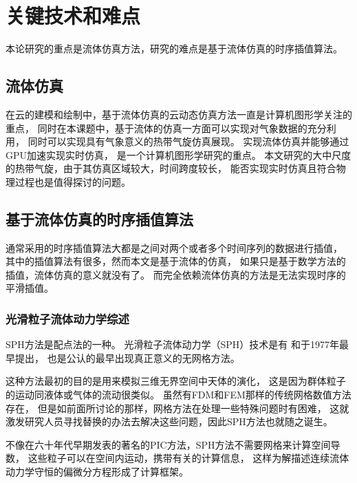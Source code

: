 \chapter{关键技术和难点}
\label{chap:keytechnology}

\qquad{}本论研究的重点是流体仿真方法，研究的难点是基于流体仿真的时序插值算法。 

\section{流体仿真}
\label{sec:fulid-simulation}
在云的建模和绘制中，基于流体仿真的云动态仿真方法一直是计算机图形学关注的重点，
同时在本课题中，基于流体的仿真一方面可以实现对气象数据的充分利用，
同时可以实现具有气象意义的热带气旋仿真展现。
实现流体仿真并能够通过GPU加速实现实时仿真，
是一个计算机图形学研究的重点。
本文研究的大中尺度的热带气旋，由于其仿真区域较大，时间跨度较长，
能否实现实时仿真且符合物理过程也是值得探讨的问题。

\section{基于流体仿真的时序插值算法}
通常采用的时序插值算法大都是之间对两个或者多个时间序列的数据进行插值，
其中的插值算法有很多，然而本文是基于流体的仿真，
如果只是基于数学方法的插值，流体仿真的意义就没有了。
而完全依赖流体仿真的方法是无法实现时序的平滑插值。

\subsection {光滑粒子流体动力学综述}
\label{subsec:sph-rev}

SPH方法是配点法的一种。
光滑粒子流体动力学（SPH）技术是有\citeauthor{Lucy1977A}
和\citeauthor{Gingold1977Smoothed}于1977年最早提出，
也是公认的最早出现真正意义的无网格方法。

这种方法最初的目的是用来模拟三维无界空间中天体的演化，
这是因为群体粒子的运动同液体或气体的流动很类似。
虽然有FDM和FEM那样的传统网格数值方法存在，
但是如前面所讨论的那样，网格方法在处理一些特殊问题时有困难，
这就激发研究人员寻找替换的办法去解决这些问题，因此SPH方法也就随之诞生。

不像在六十年代早期发表的著名的PIC方法，SPH方法不需要网格来计算空间导数，
这些粒子可以在空间内运动，携带有关的计算信息，
这样为解描述连续流体动力学守恒的偏微分方程形成了计算框架。


